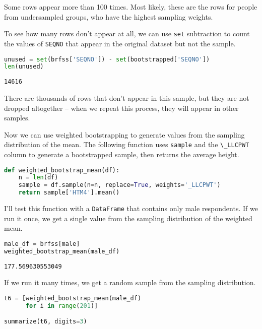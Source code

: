 Some rows appear more than 100 times. Most likely, these are the rows
for people from undersampled groups, who have the highest sampling
weights.

To see how many rows don't appear at all, we can use
\passthrough{\lstinline!set!} subtraction to count the values of
\passthrough{\lstinline!SEQNO!} that appear in the original dataset but
not the sample.

\begin{lstlisting}[language=Python,style=source]
unused = set(brfss['SEQNO']) - set(bootstrapped['SEQNO'])
len(unused)
\end{lstlisting}

\begin{lstlisting}[style=output]
14616
\end{lstlisting}

There are thousands of rows that don't appear in this sample, but they
are not dropped altogether -- when we repeat this process, they will
appear in other samples.

Now we can use weighted bootstrapping to generate values from the
sampling distribution of the mean. The following function uses
\passthrough{\lstinline!sample!} and the
\passthrough{\lstinline!\_LLCPWT!} column to generate a bootstrapped
sample, then returns the average height.

\begin{lstlisting}[language=Python,style=source]
def weighted_bootstrap_mean(df):
    n = len(df)
    sample = df.sample(n=n, replace=True, weights='_LLCPWT')
    return sample['HTM4'].mean()
\end{lstlisting}

I'll test this function with a \passthrough{\lstinline!DataFrame!} that
contains only male respondents. If we run it once, we get a single value
from the sampling distribution of the weighted mean.

\begin{lstlisting}[language=Python,style=source]
male_df = brfss[male]
weighted_bootstrap_mean(male_df)
\end{lstlisting}

\begin{lstlisting}[style=output]
177.569630553049
\end{lstlisting}

\pagebreak

If we run it many times, we get a random sample from the sampling
distribution.

\begin{lstlisting}[language=Python,style=source]
t6 = [weighted_bootstrap_mean(male_df)
      for i in range(201)]

summarize(t6, digits=3)
\end{lstlisting}

